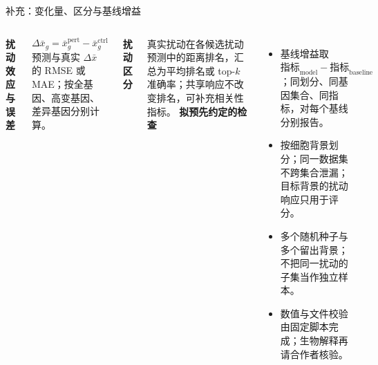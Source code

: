 \begin{frame}[t]{补充：变化量、区分与基线增益}
\begin{columns}[T,onlytextwidth]
 \textbf{扰动效应与误差}\par
 \[\Delta\bar{x}_g=\bar{x}^{\mathrm{pert}}_g-\bar{x}^{\mathrm{ctrl}}_g\]
 \bodyfont 预测与真实 $\Delta\bar{x}$ 的 RMSE 或 MAE；按全基因、高变基因、差异基因分别计算。\par\vspace{.22cm}
 \textbf{扰动区分}\par
 \bodyfont 真实扰动在各候选扰动预测中的距离排名，汇总为平均排名或 top-$k$ 准确率；共享响应不改变排名，可补充相关性指标。
 \textbf{拟预先约定的检查}\par
 \begin{itemize}\bodyfont
 \item 基线增益取 $\text{指标}_{\mathrm{model}}-\text{指标}_{\mathrm{baseline}}$；同划分、同基因集合、同指标，对每个基线分别报告。
 \item 按细胞背景划分；同一数据集不跨集合泄漏；目标背景的扰动响应只用于评分。
 \item 多个随机种子与多个留出背景；不把同一扰动的子集当作独立样本。
 \item 数值与文件校验由固定脚本完成；生物解释再请合作者核验。
 \end{itemize}
\end{columns}
\end{frame}
